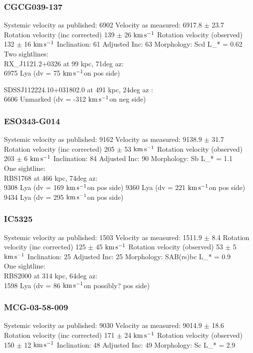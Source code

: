 \documentclass[iop]{emulateapj-rtx4}
\newcommand{\kms}{$\rm km\, s^{-1}$}
\begin{document}
\subsubsection{CGCG039-137}
Systemic velocity as published: 6902
Velocity as measured: 6917.8 $\pm$ 23.7
Rotation velocity (inc corrected) 139 $\pm$ 26 \kms
Rotation velocity (observed) 132 $\pm$ 16 \kms
Inclination: 61
Adjusted Inc: 63
Morphology: Scd
L_{\**} = 0.62 \\

Two sightlines: \\
RX_J1121.2+0326 at 99 kpc, 71deg az: \\
6975 Lya (dv = 75 \kms on pos side)

SDSSJ112224.10+031802.0 at 491 kpc, 24deg az : \\
6606 Unmarked (dv = -312 \kms on neg side)



\subsubsection{ESO343-G014}
Systemic velocity as published: 9162
Velocity as measured: 9138.9 $\pm$ 31.7
Rotation velocity (inc corrected) 205 $\pm$ 53 \kms
Rotation velocity (observed) 203 $\pm$ 6 \kms
Inclination: 84
Adjusted Inc: 90
Morphology: Sb
L_{\**} = 1.1 \\

One sightline: \\
RBS1768 at 466 kpc, 74deg az: \\
9308 Lya (dv = 169 \kms on pos side)
9360 Lya (dv = 221 \kms on pos side)
9434 Lya (dv = 295 \kms on pos side)


\subsubsection{IC5325}
Systemic velocity as published: 1503
Velocity as measured: 1511.9 $\pm$ 8.4
Rotation velocity (inc corrected) 125 $\pm$ 45 \kms
Rotation velocity (observed) 53 $\pm$ 5 \kms
Inclination: 25
Adjusted Inc: 25
Morphology: SAB(rs)bc
L_{\**} = 0.9 \\

One sightline: \\
RBS2000 at 314 kpc, 64deg az: \\
1598 Lya (dv = 86 \kms on possibly? pos side)


\subsubsection{MCG-03-58-009}
Systemic velocity as published: 9030
Velocity as measured: 9014.9 $\pm$ 18.6
Rotation velocity (inc corrected) 171 $\pm$ 24 \kms
Rotation velocity (observed) 150 $\pm$ 12 \kms
Inclination: 48
Adjusted Inc: 49
Morphology: Sc
L_{\**} = 2.9 \\
\end{document}
